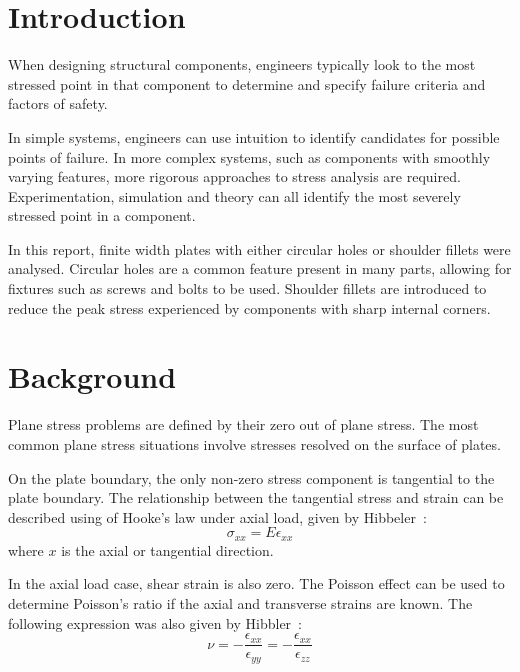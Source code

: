 \documentclass[a4paper,11pt,twocolumn]{article}
\begin{document}
\printnomenclature

\section{Introduction}

When designing structural components, engineers typically look to the most
stressed point in that component to determine and specify failure criteria and
factors of safety.

In simple systems, engineers can use intuition to identify candidates for
possible points of failure. In more complex systems, such as components
with smoothly varying features, more rigorous approaches to stress analysis 
are required. Experimentation, simulation and theory can all identify the most 
severely stressed point in a component.

In this report, finite width plates with either circular holes or shoulder
fillets were analysed. Circular holes are a common feature present in many
parts, allowing for fixtures such as screws and bolts to be used. Shoulder
fillets are introduced to reduce the peak stress experienced by components with
sharp internal corners.

\section{Background}

Plane stress problems are defined by their zero out of plane stress. The most 
common plane stress situations involve stresses resolved on the surface of 
plates.

On the plate boundary, the only non-zero stress component is tangential to
the plate boundary. The relationship between the tangential stress and strain 
can be described using of Hooke's law under axial load, given by 
\mbox{Hibbeler~\cite[p.~88]{hibbeler2017mechanics}}:
\begin{equation} \label{eq:hooke-axial}
    \sigma_{xx} = E\epsilon_{xx}
\end{equation}
where $x$ is the axial or tangential direction.

In the axial load case, shear strain is also zero. The Poisson
effect can be used to determine Poisson's ratio if the axial and
transverse strains are known. The following expression was also given by
\mbox{Hibbler~\cite[p.~106]{hibbeler2017mechanics}}:
\begin{equation} \label{eq:poisson}
    \nu = -\frac{\epsilon_{xx}}{\epsilon_{yy}} 
        = -\frac{\epsilon_{xx}}{\epsilon_{zz}}
\end{equation}
\end{document}

